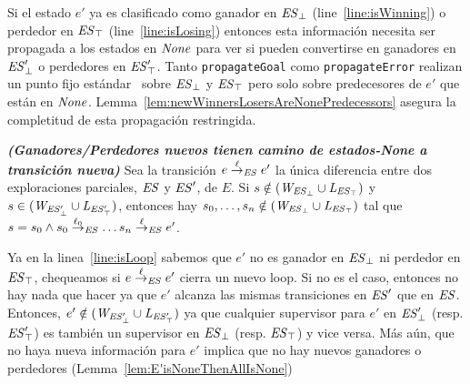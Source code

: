 Si el estado $e'$ ya es clasificado como ganador en
$\mathit{\mathit{ES}_{\bot}}$ (line~\ref{line:isWinning}) o
perdedor en $\mathit{\mathit{ES}_{\top}}$ (line~\ref{line:isLosing}) 
entonces esta información necesita ser propagada a los estados en $\mathit{None}$ para ver si pueden convertirse en ganadores en 
$\mathit{\mathit{ES}'_{\bot}}$ o perdedores en
$\mathit{\mathit{ES}'_{\top}}$. Tanto \texttt{propagateGoal} como
\texttt{propagateError} realizan un punto fijo estándar~\cite{Ramadge:1989:CDES} sobre
$\mathit{\mathit{ES}_{\bot}}$ y
$\mathit{\mathit{ES}_{\top}}$ pero solo sobre predecesores de $e'$ que están en $\mathit{None}$. 
Lemma~\ref{lem:newWinnersLosersAreNonePredecessors} asegura la completitud de esta propagación restringida.

\begin{lemma}\textbf{\emph{(Ganadores/Perdedores nuevos tienen camino de estados-\textit{None} a transición nueva)}}
\label{lem:newWinnersLosersAreNonePredecessors}
Sea la transición $e \overset{\ell}{\rightarrow}_{\mathit{ES}} e'$ la única diferencia entre dos exploraciones parciales, $\mathit{ES}$ y $\mathit{ES}'$, de $E$. Si $s \notin (\mathit{W_{\mathit{\mathit{ES}_{\bot}}}} \cup \mathit{L_{\mathit{\mathit{ES}_{\top}}}})$ y $s \in (\mathit{W_{\mathit{\mathit{ES}'_{\bot}}}} \cup \mathit{L_{\mathit{\mathit{ES}'_{\top}}}})$, entonces hay $s_0, \ldots, s_n \notin (\mathit{W_{\mathit{\mathit{ES}_{\bot}}}} \cup \mathit{L_{\mathit{\mathit{ES}_{\top}}}})$ tal que $s = s_0 \wedge
s_0 \overset{\ell_0}{\rightarrow}_{\mathit{ES}}\ldots s_{n} \overset{\ell}{\rightarrow}_{\mathit{ES}} e'$.
\end{lemma}

Ya en la linea~\ref{line:isLoop} sabemos que $e'$ no es ganador en $\mathit{\mathit{ES}_{\bot}}$ ni perdedor en $\mathit{\mathit{ES}_{\top}}$, chequeamos si $e 
\overset{\ell}{\rightarrow}_{\mathit{ES}} e'$ cierra un nuevo loop. Si no es el caso, entonces no hay nada que hacer ya que $e'$ alcanza las mismas transiciones en $\mathit{ES}'$ que en $\mathit{ES}$. Entonces, $e' \notin 
(\mathit{W_{\mathit{\mathit{ES}'_{\bot}}}} \cup \mathit{L_{\mathit{\mathit{ES}'_{\top}}}})$ ya que cualquier supervisor para $e'$ en $\mathit{\mathit{ES}'_{\bot}}$ (resp. $\mathit{\mathit{ES}'_{\top}}$) es también un supervisor en $\mathit{\mathit{ES}_{\bot}}$ (resp. 
$\mathit{\mathit{ES}_{\top}}$) y vice versa.
%
%
Más aún, que no haya nueva información para $e'$ implica que no hay nuevos ganadores o perdedores (Lemma~\ref{lem:E'isNoneThenAllIsNone})

